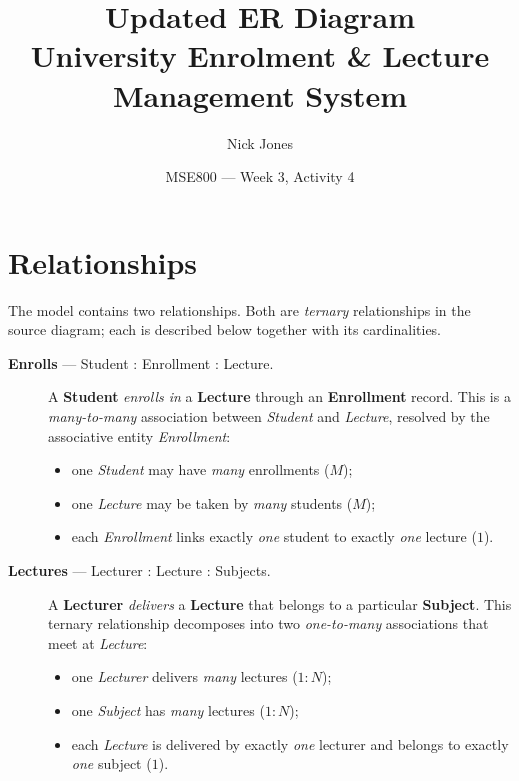 \documentclass[11pt]{article}
\begin{document}
\title{\textbf{Updated ER Diagram}\\[4pt]
\large University Enrolment \& Lecture Management System}
\author{Nick Jones}
\date{MSE800 --- Week 3, Activity 4}
\maketitle

\section*{Relationships}

The model contains two relationships. Both are \emph{ternary} relationships in
the source diagram; each is described below together with its cardinalities.

\begin{description}
  \item[\textbf{Enrolls} --- Student : Enrollment : Lecture.]
    A \textbf{Student} \emph{enrolls in} a \textbf{Lecture} through an
    \textbf{Enrollment} record. This is a \emph{many-to-many} association
    between \emph{Student} and \emph{Lecture}, resolved by the associative
    entity \emph{Enrollment}:
    \begin{itemize}
      \item one \emph{Student} may have \emph{many} enrollments ($M$);
      \item one \emph{Lecture} may be taken by \emph{many} students ($M$);
      \item each \emph{Enrollment} links exactly \emph{one} student to exactly
            \emph{one} lecture ($1$).
    \end{itemize}

  \item[\textbf{Lectures} --- Lecturer : Lecture : Subjects.]
    A \textbf{Lecturer} \emph{delivers} a \textbf{Lecture} that belongs to a
    particular \textbf{Subject}. This ternary relationship decomposes into two
    \emph{one-to-many} associations that meet at \emph{Lecture}:
    \begin{itemize}
      \item one \emph{Lecturer} delivers \emph{many} lectures ($1:N$);
      \item one \emph{Subject} has \emph{many} lectures ($1:N$);
      \item each \emph{Lecture} is delivered by exactly \emph{one} lecturer and
            belongs to exactly \emph{one} subject ($1$).
    \end{itemize}
\end{description}
\end{document}
